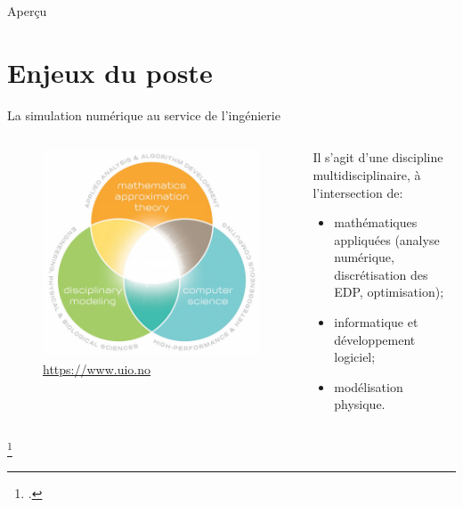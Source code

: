 \documentclass[aspectratio=169, french]{beamer}
\begin{document}
	
	
\begin{frame}[plain]
	
	
	
\end{frame}

	
	
\begin{frame}{Aperçu}
		
		\tableofcontents
		
\end{frame}
	
	\section{Enjeux du poste}
	
	\begin{frame}{La simulation numérique au service de l'ingénierie}
		
		\begin{columns}
			\begin{column}{.45\textwidth}
			\begin{figure}
				\includegraphics[width=.9\textwidth]{cse.jpg}
				\caption{\href{https://www.uio.no/english/studies/programmes/computational-science-master/why-choose/}{https://www.uio.no}}
			\end{figure}	
			\end{column}
			\begin{column}{.5\textwidth}
			Il s'agit d'une discipline multidisciplinaire, à l'intersection de\footnotemark :
			\begin{itemize}
				\item mathématiques appliquées (analyse numérique, discrétisation des EDP, optimisation);
				\item informatique et développement logiciel;
				\item modélisation physique.
			\end{itemize}
			
			\end{column}
		\end{columns}	
		\footcitetext{ulrich2018cse}
	\end{frame}
\end{document}
